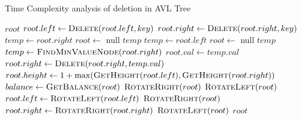 \documentclass{beamer}
\begin{document}
  \begin{frame}{Time Complexity analysis of deletion in AVL Tree}
    \begin{algorithm}
    \caption{Delete operation in AVL tree}
    \begin{algorithmic}[1]
            \State \Return $root$                      
        \EndIf
            \State $root.left \gets \textsc{Delete}(root.left, key)$   
            \State $root.right \gets \textsc{Delete}(root.right, key)$ 
        \Else
                \State $temp \gets root.right$
                \State $root \gets$ null
                \State \Return $temp$                              
                \State $temp \gets root.left$
                \State $root \gets$ null
                \State \Return $temp$                              
            \Else
                \State $temp \gets \textsc{FindMinValueNode}(root.right)$   
                \State $root.val \gets temp.val$
                \State $root.right \gets \textsc{Delete}(root.right, temp.val)$  
            \EndIf
        \EndIf
        \State $root.height \gets 1 + \max(\textsc{GetHeight}(root.left), \textsc{GetHeight}(root.right))$ 
        \State $balance \gets \textsc{GetBalance}(root)$                    
            \State \Return $\textsc{RotateRight}(root)$                     
        \EndIf
            \State \Return $\textsc{RotateLeft}(root)$                      
        \EndIf
            \State $root.left \gets \textsc{RotateLeft}(root.left)$         
            \State \Return $\textsc{RotateRight}(root)$                     
        \EndIf
            \State $root.right \gets \textsc{RotateRight}(root.right)$      
            \State \Return $\textsc{RotateLeft}(root)$                      
        \EndIf
        \State \Return $root$                                              
    \EndFunction
    \end{algorithmic}
    \end{algorithm}
\end{frame}
\end{document}
